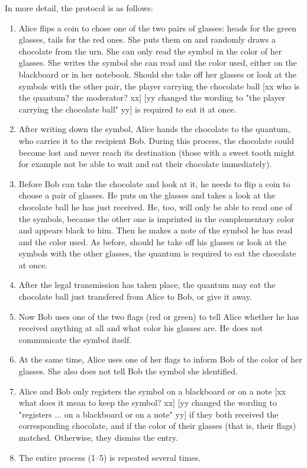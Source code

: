 \documentclass[prb,amssymb,preprint]{revtex4}
\begin{document}
In more detail, the protocol is as follows:

\begin{enumerate}

\item Alice flips a coin to chose one of the two pairs of glasses: heads
for the green glasses, tails for the red ones. She puts them on and randomly
draws a chocolate from the urn. She can only read the symbol in the color
of her glasses.  She
writes the symbol she can read and the color used, either on the blackboard
or in her notebook. Should she take off her glasses or look at
the symbols with the other pair, the player carrying the chocolate ball
[xx who is the quantum? the moderator? xx]
[yy changed the wording to "the player carrying the chocolate ball" yy]
is required to eat it
at once.

\item After writing down the symbol, Alice hands the chocolate to the
quantum, who carries it to the recipient Bob. During this process,
the chocolate could become lost and never reach its destination (those with
a sweet tooth might for example not be able to wait and eat their chocolate
immediately).

\item Before Bob can take the chocolate and look at it, he needs to
flip a coin to choose a pair of glasses. He puts on the glasses and takes a
look at the chocolate ball he has just received. He, too, will only be able
to read one of the symbols, because the other one is imprinted in the
complementary color and appears black to him. Then he makes a note of the
symbol he has read and the color used. As before, should he take off his
glasses or look at the symbols with the other glasses, the quantum is
required to eat the chocolate at once.

\item After the legal transmission has taken place, the quantum may eat the
chocolate ball just transfered from Alice to Bob, or give it away.

\item Now Bob uses one of the two flags (red or green) to tell Alice whether
he has received anything at all and what color his glasses are. He does not
communicate the symbol itself.

\item At the same time, Alice uses one of her flags to inform Bob of the
color of her glasses. She also does not tell Bob the symbol she identified.

\item
Alice and Bob only registers the symbol on a blackboard or on a note
[xx what does it mean to keep the symbol? xx]
[yy changed the wording to "registers ...  on a blackboard or on a note" yy]
if they both received the corresponding chocolate, and if the
color of their glasses (that is, their flags) matched. Otherwise, they
dismiss the entry.

\item The entire process (1--5) is repeated several times.
\end{enumerate}
\end{document}
